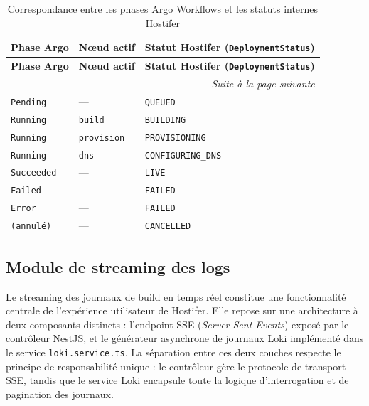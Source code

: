 \begin{longtable}{|p{3.5cm}|p{3cm}|p{6.5cm}|}
\caption{Correspondance entre les phases Argo Workflows et les statuts internes Hostifer}
\label{tab:argo-status-mapping} \\

\hline
\textbf{Phase Argo} & \textbf{Nœud actif} & \textbf{Statut Hostifer (\texttt{DeploymentStatus})} \\
\hline
\endfirsthead

\hline
\textbf{Phase Argo} & \textbf{Nœud actif} & \textbf{Statut Hostifer (\texttt{DeploymentStatus})} \\
\hline
\endhead

\hline
\multicolumn{3}{r|}{\small\textit{Suite à la page suivante}} \\
\endfoot

\hline
\endlastfoot

\texttt{Pending}    & —                   & \texttt{QUEUED} \\
\hline
\texttt{Running}    & \texttt{build}      & \texttt{BUILDING} \\
\hline
\texttt{Running}    & \texttt{provision}  & \texttt{PROVISIONING} \\
\hline
\texttt{Running}    & \texttt{dns}        & \texttt{CONFIGURING\_DNS} \\
\hline
\texttt{Succeeded}  & —                   & \texttt{LIVE} \\
\hline
\texttt{Failed}     & —                   & \texttt{FAILED} \\
\hline
\texttt{Error}      & —                   & \texttt{FAILED} \\
\hline
\texttt{(annulé)}   & —                   & \texttt{CANCELLED} \\
\hline

\end{longtable}

\subsection{Module de streaming des logs}

Le streaming des journaux de build en temps réel constitue une fonctionnalité centrale de l'expérience utilisateur de Hostifer. Elle repose sur une architecture à deux composants distincts : l'endpoint SSE (\textit{Server-Sent Events}) exposé par le contrôleur NestJS, et le générateur asynchrone de journaux Loki implémenté dans le service \texttt{loki.service.ts}. La séparation entre ces deux couches respecte le principe de responsabilité unique : le contrôleur gère le protocole de transport SSE, tandis que le service Loki encapsule toute la logique d'interrogation et de pagination des journaux.

